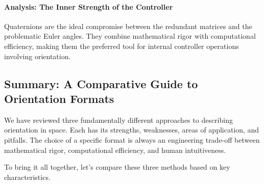\paragraph{Analysis: The Inner Strength of the Controller}
Quaternions are the ideal compromise between the redundant matrices and the problematic Euler angles. They combine mathematical rigor with computational efficiency, making them the preferred tool for internal controller operations involving orientation.

\subsection{Summary: A Comparative Guide to Orientation Formats}
We have reviewed three fundamentally different approaches to describing orientation in space. Each has its strengths, weaknesses, areas of application, and pitfalls. The choice of a specific format is always an engineering trade-off between mathematical rigor, computational efficiency, and human intuitiveness.

To bring it all together, let's compare these three methods based on key characteristics.

